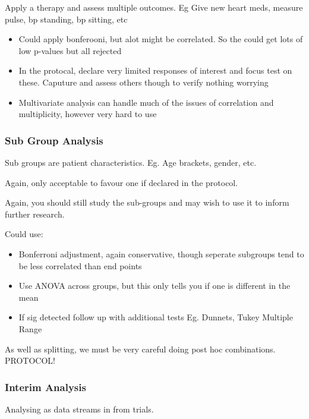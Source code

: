 \documentclass[
  letterpaper,
  DIV=11,
  numbers=noendperiod]{scrreprt}
\providecommand{\tightlist}{%
  \setlength{\itemsep}{0pt}\setlength{\parskip}{0pt}}\usepackage{longtable,booktabs,array}
\begin{document}
Apply a therapy and assess multiple outcomes. Eg Give new heart meds,
measure pulse, bp standing, bp sitting, etc

\begin{itemize}
\tightlist
\item
  Could apply bonferooni, but alot might be correlated. So the could get
  lots of low p-values but all rejected
\item
  In the protocal, declare very limited responses of interest and focus
  test on these. Caputure and assess others though to verify nothing
  worrying
\item
  Multivariate analysis can handle much of the issues of correlation and
  multiplicity, however very hard to use
\end{itemize}

\hypertarget{sub-group-analysis}{%
\subsubsection{Sub Group Analysis}\label{sub-group-analysis}}

Sub groups are patient characteristics. Eg. Age brackets, gender, etc.

Again, only acceptable to favour one if declared in the protocol.

Again, you should still study the sub-groups and may wish to use it to
inform further research.

Could use:

\begin{itemize}
\tightlist
\item
  Bonferroni adjustment, again conservative, though seperate subgroups
  tend to be less correlated than end points
\item
  Use ANOVA across groups, but this only tells you if one is different
  in the mean
\item
  If sig detected follow up with additional tests Eg. Dunnets, Tukey
  Multiple Range
\end{itemize}

As well as splitting, we must be very careful doing post hoc
combinations. PROTOCOL!

\hypertarget{interim-analysis}{%
\subsubsection{Interim Analysis}\label{interim-analysis}}

Analysing as data streams in from trials.
\end{document}
